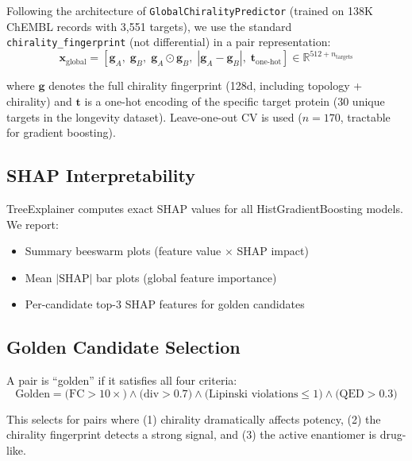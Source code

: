\documentclass[11pt,a4paper]{article}
\newcommand{\FC}{\text{FC}}
\begin{document}
Following the architecture of \texttt{GlobalChiralityPredictor} (trained
on 138K ChEMBL records with 3{,}551 targets), we use the standard
\texttt{chirality\_fingerprint} (not differential) in a pair representation:
\begin{equation}
    \mathbf{x}_{\text{global}} = [\mathbf{g}_A,\; \mathbf{g}_B,\;
    \mathbf{g}_A \odot \mathbf{g}_B,\; |\mathbf{g}_A - \mathbf{g}_B|,\;
    \mathbf{t}_{\text{one-hot}}] \in \mathbb{R}^{512 + n_{\text{targets}}}
\end{equation}

\noindent where $\mathbf{g}$ denotes the full chirality fingerprint (128d,
including topology + chirality) and $\mathbf{t}$ is a one-hot encoding
of the specific target protein (30 unique targets in the longevity dataset).
Leave-one-out CV is used ($n = 170$, tractable for gradient boosting).

\subsection{SHAP Interpretability}

TreeExplainer \cite{lundberg2020} computes exact SHAP values for all
HistGradientBoosting models. We report:
\begin{itemize}[nosep]
    \item Summary beeswarm plots (feature value $\times$ SHAP impact)
    \item Mean $|\text{SHAP}|$ bar plots (global feature importance)
    \item Per-candidate top-3 SHAP features for golden candidates
\end{itemize}

\subsection{Golden Candidate Selection}

A pair is ``golden'' if it satisfies all four criteria:
\begin{equation}
    \text{Golden} = \big(\FC > 10\times\big) \wedge
    \big(\text{div} > 0.7\big) \wedge
    \big(\text{Lipinski violations} \leq 1\big) \wedge
    \big(\text{QED} > 0.3\big)
\end{equation}

\noindent This selects for pairs where (1) chirality dramatically affects
potency, (2) the chirality fingerprint detects a strong signal, and
(3) the active enantiomer is drug-like.

\end{document}
